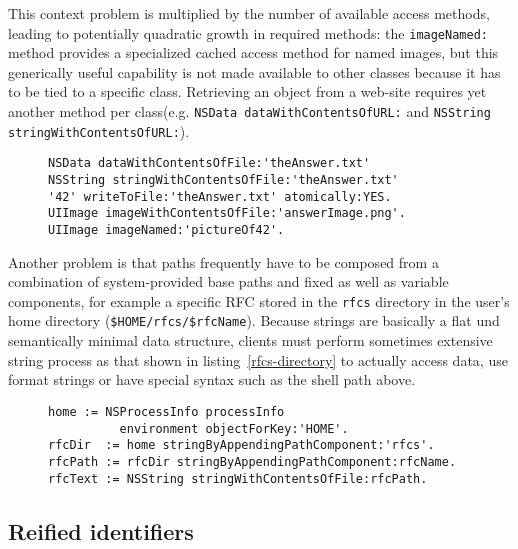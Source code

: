 \documentclass[preprint,authoryear]{acm_proc_article-sp}
\begin{document}
This context problem is multiplied by the number of available access methods, leading to potentially quadratic growth in
required methods:
the {\tt imageNamed:} method provides a specialized cached access method for named images, but this generically useful
capability is not made available to other classes because it has to be tied to a specific class.  Retrieving an object from
a web-site requires yet another method per class(e.g. {\tt NSData dataWithContentsOfURL:} and {\tt NSString stringWithContentsOfURL:}).



\begin{figure}[htbp]
\begin{lstlisting}[style=numbers,label=string-file-identifiers,caption=Files of different types accessed using string identifiers.]
NSData dataWithContentsOfFile:'theAnswer.txt'
NSString stringWithContentsOfFile:'theAnswer.txt'
'42' writeToFile:'theAnswer.txt' atomically:YES.
UIImage imageWithContentsOfFile:'answerImage.png'.
UIImage imageNamed:'pictureOf42'.
\end{lstlisting}
\end{figure}

Another problem is that paths frequently have to be composed from a combination of system-provided base paths
and fixed as well as variable components, for example a specific RFC stored in the {\tt rfcs} directory in the user's
home directory ({\tt \$HOME/rfcs/\$rfcName}).  Because strings are basically a flat und semantically minimal data structure, clients
must perform sometimes extensive string process as that shown in listing~\ref{rfcs-directory} to actually access
data, use format strings or have special syntax such as the shell path above.

\begin{figure}[htbp]
\begin{lstlisting}[style=numbers,label=rfcs-directory,caption=Accessing a specific RFC in a directory relative to the user's \$HOME.]
home := NSProcessInfo processInfo 
          environment objectForKey:'HOME'.
rfcDir  := home stringByAppendingPathComponent:'rfcs'.
rfcPath := rfcDir stringByAppendingPathComponent:rfcName.
rfcText := NSString stringWithContentsOfFile:rfcPath.
\end{lstlisting}
\end{figure}




\subsection{Reified identifiers}
\end{document}
